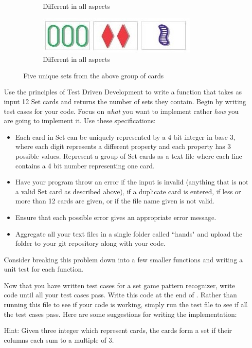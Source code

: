 \begin{problem}
\begin{figure}[H]
\begin{subfigure}{.47\textwidth}
    \caption{Different in all aspects}
    \label{fig:labeltheotherfigure}
\end{subfigure}
\begin{subfigure}{.47\textwidth}
    \centering
    \includegraphics[width=\linewidth]{figures/set5.jpg}
    \caption{Different in all aspects}
    \label{fig:labeltheotherfigure}
\end{subfigure}
\caption{Five unique sets from the above group of cards}
\end{figure}


\vspace{5mm}

Use the principles of Test Driven Development to write a function that takes as input 12 Set cards and returns the number of sets they contain. Begin by writing test cases for your code. Focus on \emph{what} you want to implement rather \emph{how} you are going to implement it. Use these specifications:
\begin{itemize}
\item Each card in Set can be uniquely represented by a 4 bit integer in base 3, where each digit represents a different property and each property has 3 possible values. Represent a group of Set cards as a text file where each line contains a 4 bit number representing one card.
\item Have your program throw an error if the input is invalid (anything that is not a valid Set card as described above),  if a duplicate card is entered, if less or more than 12 cards are given, or if the file name given is not valid.
\item Ensure that each possible error gives an appropriate error message.
\item Aggregate all your text files in a single folder called ``hands" and upload the folder to your git repository along with your code.
\end{itemize}

Consider breaking this problem down into a few smaller functions and writing a unit test for each function.

\end{problem}

\begin{problem}
Now that you have written test cases for a set game pattern recognizer, write code until all your test cases pass. Write this code at the end of . Rather than running this file to see if your code is working, simply run the test file to see if all the test cases pass. Here are some suggestions for writing the implementation:

Hint: Given three integer which represent cards, the cards form a set if their columns each sum to a multiple of 3.

\end{problem}


